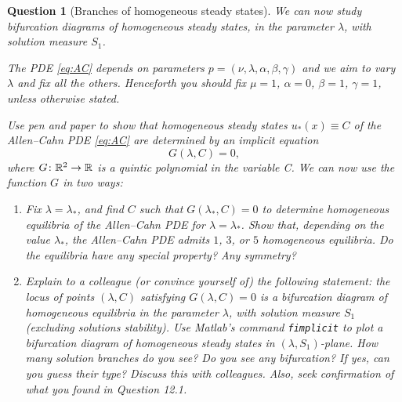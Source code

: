 \documentclass[a4paper]{siamart220329}
\theoremstyle{plain}
\newtheorem{question}{Question}
\begin{document}
\begin{question}[Branches of homogeneous steady states] We can now study
bifurcation diagrams of homogeneous steady states, in the parameter $\lambda$, with
solution measure $S_1$. 

The PDE \cref{eq:AC} depends on parameters $p =
(\nu,\lambda,\alpha,\beta,\gamma)$ and we aim to vary $\lambda$ and fix all the
others. Henceforth you should fix $\mu = 1$, $\alpha=0$, $\beta=1$, $\gamma =1$,
unless otherwise stated.

Use pen and paper to show that homogeneous steady states
$u_*(x)\equiv C$ of the Allen--Cahn PDE \cref{eq:AC} are determined by an implicit
equation
\[
  G(\lambda,C) = 0,
\]
where $G \colon \mathbb{R}^2 \to \mathbb{R}$ is a quintic polynomial in the variable C. We can now use the
function $G$ in two ways: 
\begin{enumerate}
 \item Fix $\lambda = \lambda_*$, and find $C$ such that
   $G(\lambda_*,C) = 0$ to determine homogeneous equilibria of the Allen--Cahn PDE
   for $\lambda = \lambda_*$. Show that, depending on the value $\lambda_*$, the
   Allen--Cahn PDE admits $1$, $3$, or $5$ homogeneous equilibria. Do the equilibria
   have any special property? Any symmetry?
 \item 
   Explain to a colleague (or convince yourself of) the following statement: \textit{the
   locus of points $(\lambda,C)$
   satisfying $G(\lambda,C) = 0$ is a bifurcation diagram of homogeneous equilibria
   in the parameter $\lambda$, with solution measure $S_1$ (excluding solutions
   stability).}
   Use Matlab's command \lstinline|fimplicit| to plot a
   bifurcation diagram of homogeneous steady states in $(\lambda,S_1)$-plane. How
   many solution branches do you see? Do you see any bifurcation? If yes, can you
   guess their type? Discuss this with colleagues. Also, seek confirmation of what you found in
   Question 12.1.
\end{enumerate}
\end{question}

% 
% 
\end{document}
